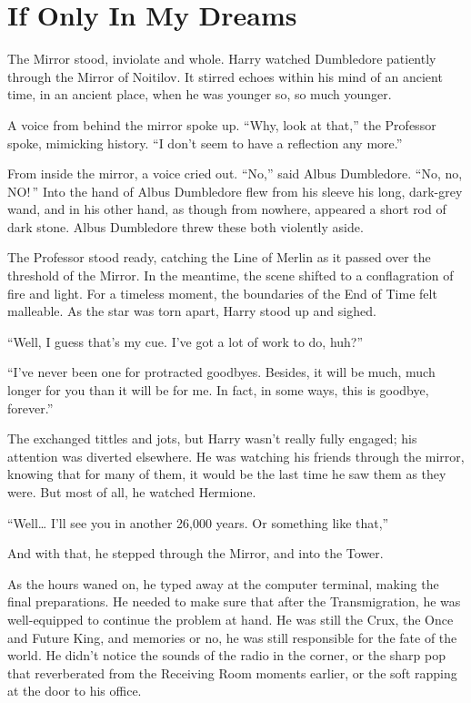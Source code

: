 \chapter{If Only In My Dreams}


The Mirror stood, inviolate and whole. Harry watched Dumbledore patiently through the Mirror of Noitilov. It stirred echoes within his mind of an ancient time, in an ancient place, when he was younger so, so much younger.

A voice from behind the mirror spoke up. “Why, look at that,” the Professor spoke, mimicking history. “I don’t seem to have a reflection any more.”

From inside the mirror, a voice cried out. “No,” said Albus Dumbledore. “No, no, NO! ” Into the hand of Albus Dumbledore flew from his sleeve his long, dark-grey wand, and in his other hand, as though from nowhere, appeared a short rod of dark stone. Albus Dumbledore threw these both violently aside.

The Professor stood ready, catching the Line of Merlin as it passed over the threshold of the Mirror. In the meantime, the scene shifted to a conflagration of fire and light. For a timeless moment, the boundaries of the End of Time felt malleable. As the star was torn apart, Harry stood up and sighed.

“Well, I guess that’s my cue. I’ve got a lot of work to do, huh?”

“I’ve never been one for protracted goodbyes. Besides, it will be much, much longer for you than it will be for me. In fact, in some ways, this is goodbye, forever.”

The exchanged tittles and jots, but Harry wasn’t really fully engaged; his attention was diverted elsewhere. He was watching his friends through the mirror, knowing that for many of them, it would be the last time he saw them as they were.  But most of all, he watched Hermione.

“Well… I’ll see you in another 26,000 years. Or something like that,”

And with that, he stepped through the Mirror, and into the Tower.
\simpleline


As the hours waned on, he typed away at the computer terminal, making the final preparations. He needed to make sure that after the Transmigration, he was well-equipped to continue the problem at hand. He was still the Crux, the Once and Future King, and memories or no, he was still responsible for the fate of the world. He didn’t notice the sounds of the radio in the corner, or the sharp pop that reverberated from the Receiving Room moments earlier, or the soft rapping at the door to his office.

